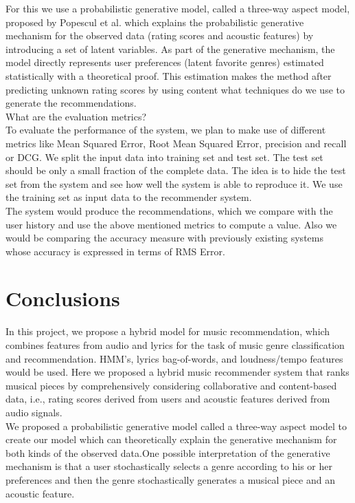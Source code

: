 \documentclass{sig-alternate-05-2015}
\begin{document}
For this we use a probabilistic generative model, called a three-way aspect model, proposed by Popescul et al. which explains the probabilistic generative mechanism for the observed data (rating scores and acoustic features) by introducing a set of latent variables. As part of the generative mechanism, the model directly represents user preferences (latent favorite genres) estimated statistically with a theoretical proof. This estimation makes the method after predicting unknown rating scores by using content what techniques do we use to generate the recommendations.\\

What are the evaluation metrics? \\

To evaluate the performance of the system, we plan to make use of different metrics like Mean Squared Error, Root Mean Squared Error, precision and recall or DCG. We split the input data into training set and test set. The test set should be only a small fraction of the complete data. The idea is to hide the test set from the system and see how well the system is able to reproduce it. We use the training set as input data to the recommender system.\\

The system would produce the recommendations, which we compare with the user history and use the above mentioned metrics to compute a value. Also we would be comparing the accuracy measure with previously existing systems whose accuracy is expressed in terms of RMS Error.

\section{Conclusions}

In this project, we propose a hybrid model for music recommendation, which combines features from audio and lyrics for the task of music genre classification and recommendation. HMM's, lyrics bag-of-words, and loudness/tempo features would be used. Here we proposed a hybrid music recommender system that ranks musical pieces by comprehensively considering collaborative and content-based data, i.e., rating scores derived from users and acoustic features derived from audio signals.\\

We proposed a probabilistic generative model called a three-way aspect model to create our model which can theoretically explain the generative mechanism for both kinds of the observed data.One possible interpretation of the generative mechanism is that a user stochastically selects a genre according to his or her preferences and then the genre stochastically generates a musical piece and an acoustic feature.\\
\end{document}
